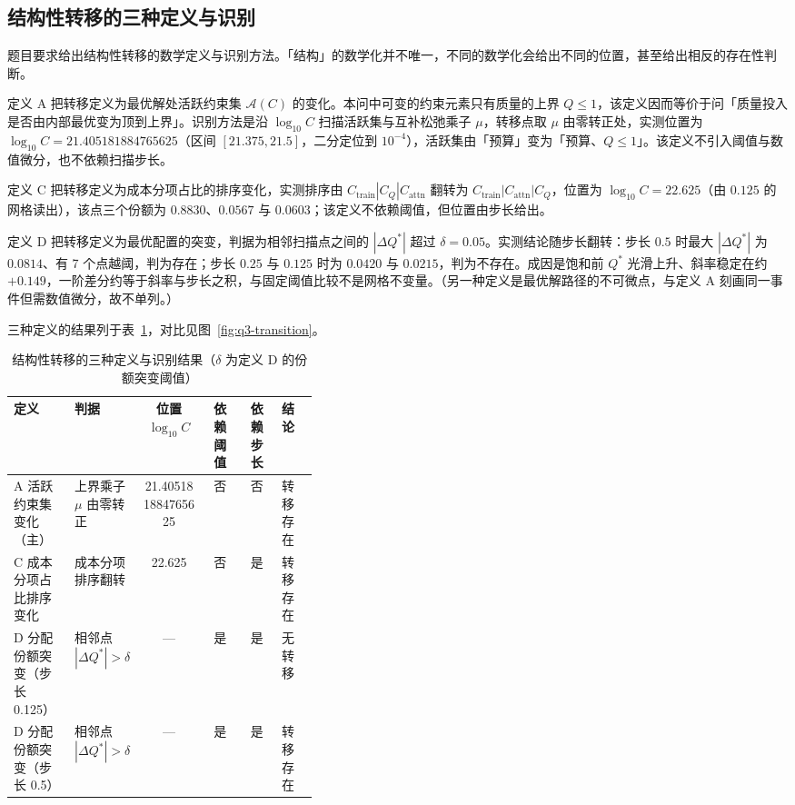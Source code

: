 \subsection{结构性转移的三种定义与识别}
\label{subsec:q3-transfer}

题目要求给出结构性转移的数学定义与识别方法。「结构」的数学化并不唯一，不同的数学化会给出不同的位置，甚至给出相反的存在性判断。

定义 A 把转移定义为最优解处活跃约束集 $\mathcal{A}(C)$ 的变化。本问中可变的约束元素只有质量的上界 $Q\le1$，该定义因而等价于问「质量投入是否由内部最优变为顶到上界」。识别方法是沿 $\log_{10}C$ 扫描活跃集与互补松弛乘子 $\mu$，转移点取 $\mu$ 由零转正处，实测位置为 $\log_{10}C=21.405181884765625$（区间 $[21.375,21.5]$，二分定位到 $10^{-4}$），活跃集由「预算」变为「预算、$Q\le1$」。该定义不引入阈值与数值微分，也不依赖扫描步长。

定义 C 把转移定义为成本分项占比的排序变化，实测排序由 $C_{\text{train}}|C_{Q}|C_{\text{attn}}$ 翻转为 $C_{\text{train}}|C_{\text{attn}}|C_{Q}$，位置为 $\log_{10}C=22.625$（由 $0.125$ 的网格读出），该点三个份额为 $0.8830$、$0.0567$ 与 $0.0603$；该定义不依赖阈值，但位置由步长给出。

定义 D 把转移定义为最优配置的突变，判据为相邻扫描点之间的 $|\Delta Q^{*}|$ 超过 $\delta=0.05$。实测结论随步长翻转：步长 $0.5$ 时最大 $|\Delta Q^{*}|$ 为 $0.0814$、有 7 个点越阈，判为存在；步长 $0.25$ 与 $0.125$ 时为 $0.0420$ 与 $0.0215$，判为不存在。成因是饱和前 $Q^{*}$ 光滑上升、斜率稳定在约 $+0.149$，一阶差分约等于斜率与步长之积，与固定阈值比较不是网格不变量。（另一种定义是最优解路径的不可微点，与定义 A 刻画同一事件但需数值微分，故不单列。）

三种定义的结果列于表~\ref{tab:q3-transfer}，对比见图~\ref{fig:q3-transition}。

\begin{table}[H]
  \centering
  \caption{结构性转移的三种定义与识别结果（$\delta$ 为定义 D 的份额突变阈值）}
  \label{tab:q3-transfer}
  \small
  \begin{tabular}{@{}p{0.20\linewidth}p{0.19\linewidth}cccl@{}}
    \toprule
    定义 & 判据 & 位置 $\log_{10}C$ & 依赖阈值 & 依赖步长 & 结论 \\
    \midrule
    A 活跃约束集变化（主） & 上界乘子 $\mu$ 由零转正 & 21.405181884765625 & 否 & 否 & 转移存在 \\
    C 成本分项占比排序变化 & 成本分项排序翻转 & 22.625 & 否 & 是 & 转移存在 \\
    D 分配份额突变（步长 0.125） & 相邻点 $|\Delta Q^{*}|>\delta$ & --- & 是 & 是 & 无转移 \\
    D 分配份额突变（步长 0.5） & 相邻点 $|\Delta Q^{*}|>\delta$ & --- & 是 & 是 & 转移存在 \\
    \bottomrule
  \end{tabular}
\end{table}


